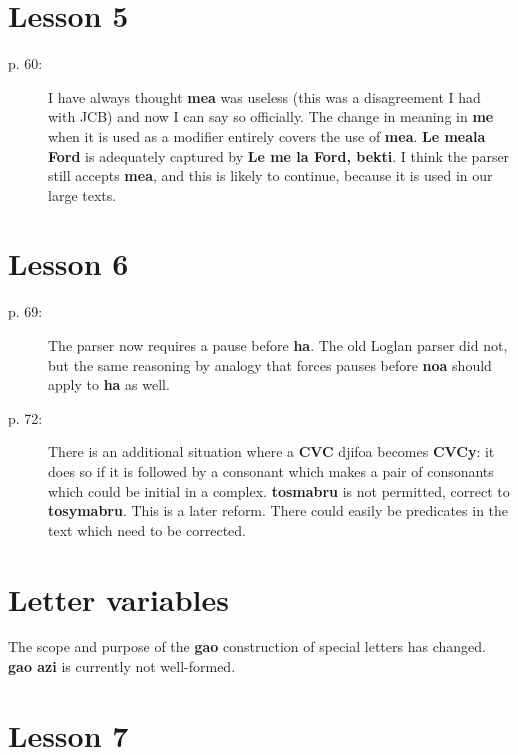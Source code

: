 \documentclass[12pt]{article}
\begin{document}
\section{Lesson 5}

\begin{description}

\item[p. 60:]  I have always thought {\bf mea} was useless (this was a disagreement I had with JCB) and now I can say so officially.  The change in meaning in {\bf me} when it is used as a modifier entirely covers the use of {\bf mea}.  {\bf Le meala Ford} is adequately captured by {\bf Le me la Ford, bekti}.  I think the parser still accepts {\bf mea}, and this is likely to continue, because it is used in our large texts.

\end{description}

\section{Lesson 6}

\begin{description}

\item[p. 69:]  The parser now requires a pause before {\bf ha}.  The old Loglan parser did not, but the same reasoning by analogy that forces pauses before {\bf noa} should apply to {\bf ha}
 as well.

\item[p. 72:]  There is an additional situation where a {\bf CVC} djifoa becomes {\bf CVCy}: it does so if it is followed by a consonant which makes a pair of consonants which could be initial in a complex.  {\bf tosmabru} is not permitted, correct to {\bf tosymabru}.  This is a later reform.  There could easily be predicates in the text which need to be corrected.

\end{description}

\section{Letter variables}

The scope and purpose of the {\bf gao} construction of special letters has changed.  {\bf gao azi} is currently not
well-formed.

\section{Lesson 7}
\end{document}
